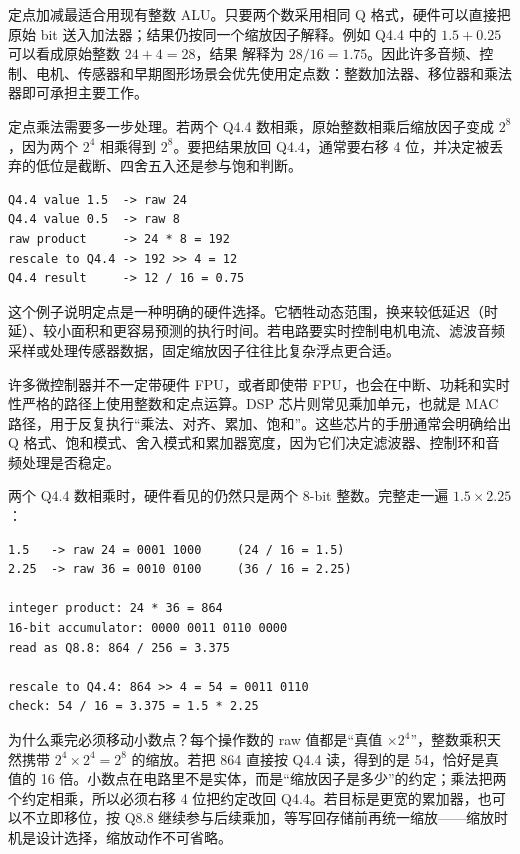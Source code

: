 定点加减最适合用现有整数 ALU。只要两个数采用相同 Q 格式，硬件可以直接把原始 bit 送入加法器；结果仍按同一个缩放因子解释。例如 Q4.4 中的 $1.5+0.25$ 可以看成原始整数 $24+4=28$，结果  解释为 $28/16=1.75$。因此许多音频、控制、电机、传感器和早期图形场景会优先使用定点数：整数加法器、移位器和乘法器即可承担主要工作。

定点乘法需要多一步处理。若两个 Q4.4 数相乘，原始整数相乘后缩放因子变成 $2^8$，因为两个 $2^4$ 相乘得到 $2^8$。要把结果放回 Q4.4，通常要右移 4 位，并决定被丢弃的低位是截断、四舍五入还是参与饱和判断。

\begin{lstlisting}
Q4.4 value 1.5  -> raw 24
Q4.4 value 0.5  -> raw 8
raw product     -> 24 * 8 = 192
rescale to Q4.4 -> 192 >> 4 = 12
Q4.4 result     -> 12 / 16 = 0.75
\end{lstlisting}

这个例子说明定点是一种明确的硬件选择。它牺牲动态范围，换来较低延迟（时延）、较小面积和更容易预测的执行时间。若电路要实时控制电机电流、滤波音频采样或处理传感器数据，固定缩放因子往往比复杂浮点更合适。

\begin{chipcase}
许多微控制器并不一定带硬件 FPU，或者即使带 FPU，也会在中断、功耗和实时性严格的路径上使用整数和定点运算。DSP 芯片则常见乘加单元，也就是 MAC 路径，用于反复执行“乘法、对齐、累加、饱和”。这些芯片的手册通常会明确给出 Q 格式、饱和模式、舍入模式和累加器宽度，因为它们决定滤波器、控制环和音频处理是否稳定。
\end{chipcase}

两个 Q4.4 数相乘时，硬件看见的仍然只是两个 8-bit 整数。完整走一遍 $1.5 \times 2.25$：

\begin{lstlisting}
1.5   -> raw 24 = 0001 1000     (24 / 16 = 1.5)
2.25  -> raw 36 = 0010 0100     (36 / 16 = 2.25)

integer product: 24 * 36 = 864
16-bit accumulator: 0000 0011 0110 0000
read as Q8.8: 864 / 256 = 3.375

rescale to Q4.4: 864 >> 4 = 54 = 0011 0110
check: 54 / 16 = 3.375 = 1.5 * 2.25
\end{lstlisting}

为什么乘完必须移动小数点？每个操作数的 raw 值都是“真值 $\times 2^{4}$”，整数乘积天然携带 $2^{4} \times 2^{4} = 2^{8}$ 的缩放。若把 864 直接按 Q4.4 读，得到的是 54，恰好是真值的 16 倍。小数点在电路里不是实体，而是“缩放因子是多少”的约定；乘法把两个约定相乘，所以必须右移 4 位把约定改回 Q4.4。若目标是更宽的累加器，也可以不立即移位，按 Q8.8 继续参与后续乘加，等写回存储前再统一缩放——缩放时机是设计选择，缩放动作不可省略。


